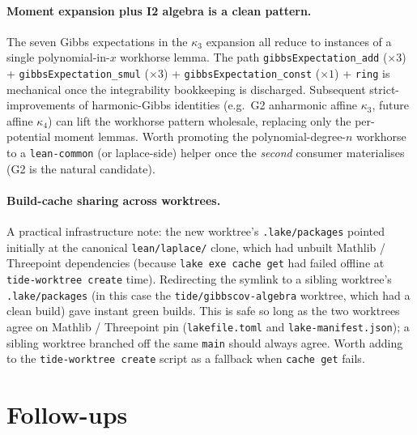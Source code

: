 \documentclass[11pt]{article}
\begin{document}
\paragraph{Moment expansion plus I2 algebra is a clean pattern.}
The seven Gibbs expectations in the $\kappa_3$ expansion all reduce
to instances of a single polynomial-in-$x$ workhorse lemma. The path
\texttt{gibbsExpectation\_add} ($\times 3$) +
\texttt{gibbsExpectation\_smul} ($\times 3$) +
\texttt{gibbsExpectation\_const} ($\times 1$) +
\texttt{ring} is mechanical once the integrability bookkeeping is
discharged. Subsequent strict-improvements of harmonic-Gibbs
identities (e.g.\ G2 anharmonic affine $\kappa_3$, future affine
$\kappa_4$) can lift the workhorse pattern wholesale, replacing
only the per-potential moment lemmas. Worth promoting the
polynomial-degree-$n$ workhorse to a \texttt{lean-common} (or
laplace-side) helper once the \emph{second} consumer materialises
(G2 is the natural candidate).

\paragraph{Build-cache sharing across worktrees.}
A practical infrastructure note: the new worktree's
\texttt{.lake/packages} pointed initially at the canonical
\texttt{lean/laplace/} clone, which had unbuilt Mathlib /
Threepoint dependencies (because \texttt{lake exe cache get} had
failed offline at \texttt{tide-worktree create} time). Redirecting
the symlink to a sibling worktree's \texttt{.lake/packages} (in this
case the \texttt{tide/gibbscov-algebra} worktree, which had a clean
build) gave instant green builds. This is safe so long as the two
worktrees agree on Mathlib / Threepoint pin (\texttt{lakefile.toml}
and \texttt{lake-manifest.json}); a sibling worktree branched off
the same \texttt{main} should always agree. Worth adding to the
\texttt{tide-worktree create} script as a fallback when
\texttt{cache get} fails.

\section{Follow-ups}
\end{document}
